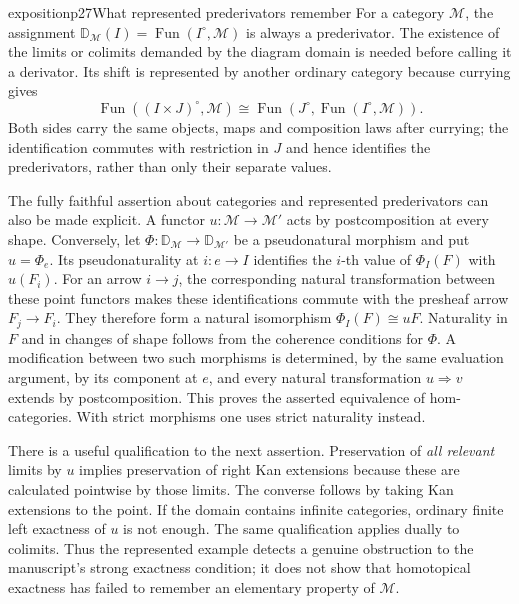 \begin{dcomment}{exposition}{p27}{What represented prederivators remember}
For a category $\mathcal M$, the assignment
$\mathbb D_{\mathcal M}(I)=\operatorname{Fun}(I^{\circ},\mathcal M)$ is
always a prederivator. The existence of the limits or colimits demanded by
the diagram domain is needed before calling it a derivator. Its shift is
represented by another ordinary category because currying gives
\[
 \operatorname{Fun}((I\times J)^{\circ},\mathcal M)
 \cong\operatorname{Fun}(J^{\circ},
             \operatorname{Fun}(I^{\circ},\mathcal M)).
\]
Both sides carry the same objects, maps and composition laws after
currying; the identification commutes with restriction in $J$ and hence
identifies the prederivators, rather than only their separate values.

The fully faithful assertion about categories and represented
prederivators can also be made explicit. A functor
$u:\mathcal M\to\mathcal M'$ acts by postcomposition at every shape.
Conversely, let $\Phi:\mathbb D_{\mathcal M}\to\mathbb D_{\mathcal M'}$
be a pseudonatural morphism and put $u=\Phi_e$. Its pseudonaturality at
$i:e\to I$ identifies the $i$-th value of $\Phi_I(F)$ with $u(F_i)$.
For an arrow $i\to j$, the corresponding natural transformation between
these point functors makes these identifications commute with the
presheaf arrow $F_j\to F_i$. They therefore form a natural isomorphism
$\Phi_I(F)\cong uF$. Naturality in $F$ and in changes of shape follows
from the coherence conditions for $\Phi$. A modification between two
such morphisms is determined, by the same evaluation argument, by its
component at $e$, and every natural transformation $u\Rightarrow v$
extends by postcomposition. This proves the asserted equivalence of
hom-categories. With strict morphisms one uses strict naturality instead.

There is a useful qualification to the next assertion. Preservation of
\emph{all relevant} limits by $u$ implies preservation of right Kan
extensions because these are calculated pointwise by those limits. The
converse follows by taking Kan extensions to the point. If the domain
contains infinite categories, ordinary finite left exactness of $u$ is
not enough. The same qualification applies dually to colimits. Thus the
represented example detects a genuine obstruction to the manuscript's
strong exactness condition; it does not show that homotopical exactness
has failed to remember an elementary property of $\mathcal M$.
\end{dcomment}


